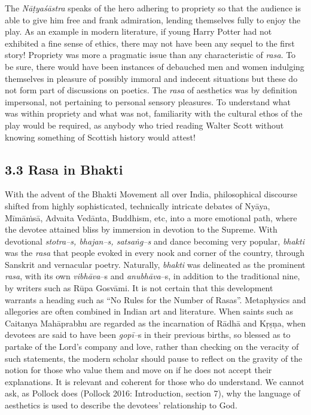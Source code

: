 The \textit{Nāṭyaśāstra} speaks of the hero adhering to propriety so that the audience is able to give him free and frank admiration, lending themselves fully to enjoy the play. As an example in modern literature, if young Harry Potter had not exhibited a fine sense of ethics, there may not have been any sequel to the first story! Propriety was more a pragmatic issue than any characteristic of \textit{rasa}. To be sure, there would have been instances of debauched men and women indulging themselves in pleasure of possibly immoral and indecent situations but these do not form part of discussions on poetics. The \textit{rasa} of aesthetics was by definition impersonal, not pertaining to personal sensory pleasures. To understand what was within propriety and what was not, familiarity with the cultural ethos of the play would be required, as anybody who tried reading Walter Scott without knowing something of Scottish history would attest!


\subsection*{3.3 Rasa in Bhakti}

With the advent of the Bhakti Movement all over India, philosophical discourse shifted from highly sophisticated, technically intricate debates of Nyāya, Mīmāṁsā, Advaita Vedānta, Buddhism, etc, into a more emotional path, where the devotee attained bliss by immersion in devotion to the Supreme. With devotional \textit{stotra–s, bhajan–s, satsaṅg–s} and dance becoming very popular, \textit{bhakti} was the \textit{rasa} that people evoked in every nook and corner of the country, through Sanskrit and vernacular poetry. Naturally, \textit{bhakti} was delineated as the prominent \textit{rasa}, with its own \textit{vibhāva}–s and \textit{anubhāva}–s, in addition to the traditional nine, by writers such as Rūpa Gosvāmi. It is not certain that this development warrants a heading such as “No Rules for the Number of Rasas”. Metaphysics and allegories are often combined in Indian art and literature. When saints such as Caitanya Mahāprabhu are regarded as the incarnation of Rādhā and Kṛṣṇa, when devotees are said to have been \textit{gopī–}s in their previous births, so blessed as to partake of the Lord’s company and love, rather than checking on the veracity of such statements, the modern scholar should pause to reflect on the gravity of the notion for those who value them and move on if he does not accept their explanations. It is relevant and coherent for those who do understand. We cannot ask, as Pollock does (Pollock 2016: Introduction, section 7), why the language of aesthetics is used to describe the devotees’ relationship to God.


